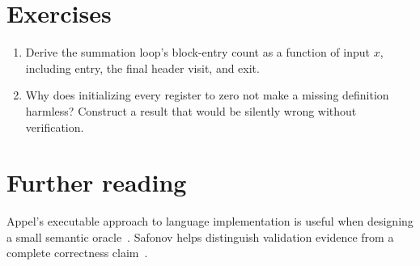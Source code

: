 \section{Exercises}
\label{sec:pebble-twelve-exercises}
\begin{enumerate}
\item \label{ex:pebble-loop-budget} Derive the summation loop's block-entry count as a function of input $x$, including entry, the final header visit, and exit.
\item \label{ex:pebble-zero-registers} Why does initializing every register to zero not make a missing definition harmless? Construct a result that would be silently wrong without verification.
\end{enumerate}

\section{Further reading}
\label{sec:pebble-twelve-reading}
Appel's executable approach to language implementation is useful when designing a small semantic oracle~\cite{appel-1998-modern}.
Safonov helps distinguish validation evidence from a complete correctness claim~\cite{safonov-2010-trustworthy}.
